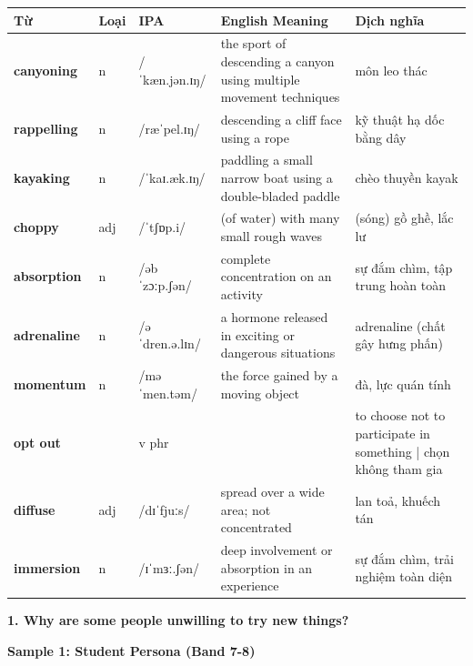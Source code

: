 \vspace{0.8em}
\begin{center}
\renewcommand{\arraystretch}{1.65}
\begin{tabularx}{\textwidth}{|V{0.22\textwidth}|C{0.07\textwidth}|I{0.20\textwidth}|Y|V{0.18\textwidth}|}
\hline
{}
\textbf{Từ} & \textbf{Loại} & \textbf{IPA} & \textbf{English Meaning} & \textbf{Dịch nghĩa} \\
\hline
\textbf{canyoning} & n & /ˈkæn.jən.ɪŋ/ & the sport of descending a canyon using multiple movement techniques & môn leo thác \\ \hline
\textbf{rappelling} & n & /ræˈpel.ɪŋ/ & descending a cliff face using a rope & kỹ thuật hạ dốc bằng dây \\ \hline
\textbf{kayaking} & n & /ˈkaɪ.æk.ɪŋ/ & paddling a small narrow boat using a double-bladed paddle & chèo thuyền kayak \\ \hline
\textbf{choppy} & adj & /ˈtʃɒp.i/ & (of water) with many small rough waves & (sóng) gồ ghề, lắc lư \\ \hline
\textbf{absorption} & n & /əbˈzɔːp.ʃən/ & complete concentration on an activity & sự đắm chìm, tập trung hoàn toàn \\ \hline
\textbf{adrenaline} & n & /əˈdren.ə.lɪn/ & a hormone released in exciting or dangerous situations & adrenaline (chất gây hưng phấn) \\ \hline
\textbf{momentum} & n & /məˈmen.təm/ & the force gained by a moving object & đà, lực quán tính \\ \hline
\textbf{opt out} & & v phr & & to choose not to participate in something | chọn không tham gia \\ \hline
\textbf{diffuse} & adj & /dɪˈfjuːs/ & spread over a wide area; not concentrated & lan toả, khuếch tán \\ \hline
\textbf{immersion} & n & /ɪˈmɜː.ʃən/ & deep involvement or absorption in an experience & sự đắm chìm, trải nghiệm toàn diện \\ \hline
\end{tabularx}
\end{center}

\partthreeheader

\begin{ieltsquestion}
\textbf{1. Why are some people unwilling to try new things?}
\end{ieltsquestion}
\textbf{Sample 1: Student Persona (Band 7-8)}

